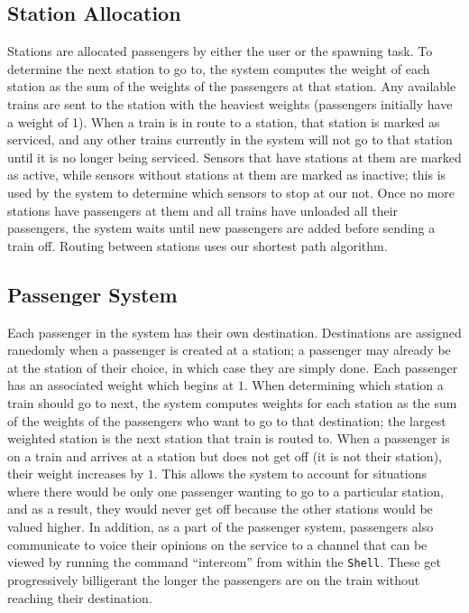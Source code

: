 \documentclass[12pt]{article}
\begin{document}
\subsection{Station Allocation}
Stations are allocated passengers by either the user or the spawning task.  To determine the next station to go to, the system computes the weight of each station as the sum of the weights of the passengers at that station.  Any available trains are sent to the station with the heaviest weights (passengers initially have a weight of 1).  When a train is in route to a station, that station is marked as serviced, and any other trains currently in the system will not go to that station until it is no longer being serviced.  Sensors that have stations at them are marked as active, while sensors without stations at them are marked as inactive; this is used by the system to determine which sensors to stop at our not.  Once no more stations have passengers at them and all trains have unloaded all their passengers, the system waits until new passengers are added before sending a train off.  Routing between stations uses our shortest path algorithm.
\\[1\baselineskip]
\subsection{Passenger System}
Each passenger in the system has their own destination.  Destinations are assigned ranedomly when a passenger is created at a station; a passenger may already be at the station of their choice, in which case they are simply done.  Each passenger has an associated weight which begins at $1$.  When determining which station a train should go to next, the system computes weights for each station as the sum of the weights of the passengers who want to go to that destination; the largest weighted station is the next station that train is routed to.  When a passenger is on a train and arrives at a station but does not get off (it is not their station), their weight increases by $1$.  This allows the system to account for situations where there would be only one passenger wanting to go to a particular station, and as a result, they would never get off because the other stations would be valued higher.  In addition, as a part of the passenger system, passengers also communicate to voice their opinions on the service to a channel that can be viewed by running the command ``intercom'' from within the \texttt{Shell}.  These get progressively billigerant the longer the passengers are on the train without reaching their destination.
\\[2\baselineskip]
\end{document}
